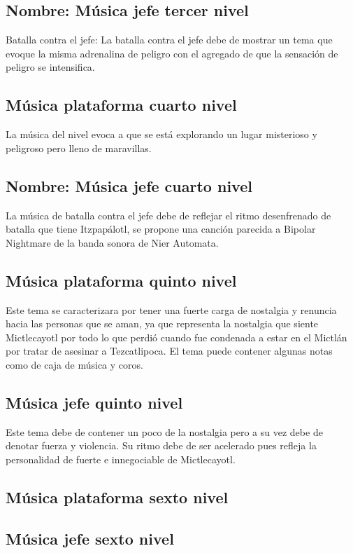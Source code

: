 \subsection{Nombre: Música jefe tercer nivel} \label{Musica:N03_ZN02}
Batalla contra el jefe: La batalla contra el jefe debe de mostrar un tema que evoque la misma adrenalina de peligro con el agregado de que la sensación de peligro se intensifica.

\subsection{Música plataforma cuarto nivel}\label{Musica:N04_ZN01}
La música del nivel evoca a que se está explorando un lugar misterioso y peligroso pero lleno de maravillas.
\subsection{Nombre: Música jefe cuarto nivel} \label{Musica:N04_ZN02}
La música de batalla contra el jefe debe de reflejar el ritmo desenfrenado de batalla que tiene Itzpapálotl, se propone una canción parecida a Bipolar Nightmare de la banda sonora de Nier Automata.

\subsection{Música plataforma quinto nivel} \label{Musica:N05_ZN01}
Este tema se caracterizara por tener una fuerte carga de nostalgia y renuncia hacia las personas que se aman, ya que representa la nostalgia que siente Mictlecayotl por todo lo que perdió cuando fue condenada a estar en el Mictlán por tratar de asesinar a Tezcatlipoca. El tema puede contener algunas notas como de caja de música y coros.

\subsection{Música jefe quinto nivel} \label{Musica:N05_ZN02}
Este tema debe de contener un poco de la nostalgia pero a su vez debe de denotar fuerza y violencia. Su ritmo debe de ser acelerado pues refleja la personalidad de fuerte e innegociable de Mictlecayotl.


\subsection{Música plataforma sexto nivel} \label{Musica:N06_ZN01}
\subsection{Música jefe sexto nivel} \label{Musica:N07_ZN01}


